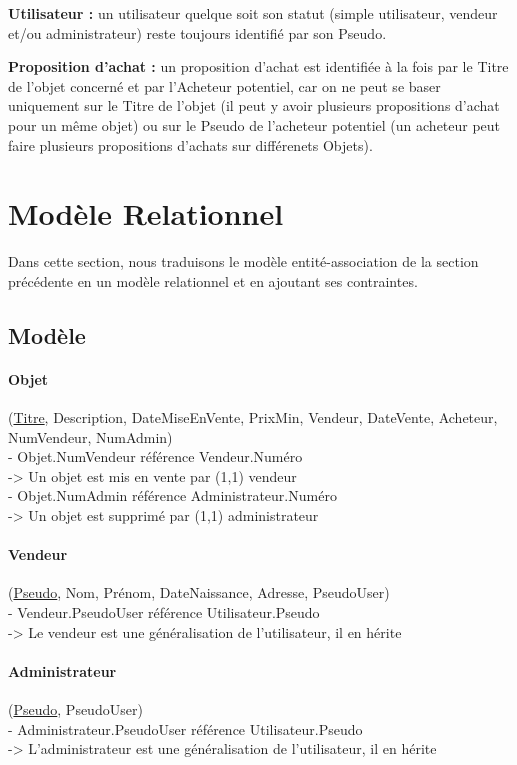 \documentclass[a4paper,11pt]{article}
\begin{document}
\textbf{Utilisateur :} un utilisateur quelque soit son statut (simple utilisateur, vendeur et/ou administrateur) reste toujours identifié
par son Pseudo.

\textbf{Proposition d'achat :} un proposition d'achat est identifiée à la fois par le Titre de l'objet concerné et par l'Acheteur potentiel,
car on ne peut se baser uniquement sur le Titre de l'objet (il peut y avoir plusieurs propositions d'achat pour un même objet)
ou sur le Pseudo de l'acheteur potentiel (un acheteur peut faire plusieurs propositions d'achats sur différenets Objets).

\section{Modèle Relationnel}
Dans cette section, nous traduisons le modèle entité-association de la section précédente en un modèle relationnel et en ajoutant ses contraintes.

\subsection{Modèle}

\indent

\paragraph{Objet} (\underline{Titre}, Description, DateMiseEnVente, PrixMin, Vendeur, DateVente, Acheteur, NumVendeur, NumAdmin)\\
\indent - Objet.NumVendeur référence Vendeur.Numéro \\
\indent \indent -> Un objet est mis en vente par (1,1) vendeur\\
\indent - Objet.NumAdmin référence Administrateur.Numéro \\
\indent \indent -> Un objet est supprimé par (1,1) administrateur


\paragraph{Vendeur} (\underline{Pseudo}, Nom, Prénom, DateNaissance, Adresse, PseudoUser)\\
\indent - Vendeur.PseudoUser référence Utilisateur.Pseudo \\
\indent \indent -> Le vendeur est une généralisation de l'utilisateur, il en hérite

\paragraph{Administrateur} (\underline{Pseudo}, PseudoUser)\\
\indent - Administrateur.PseudoUser référence Utilisateur.Pseudo \\
\indent \indent -> L'administrateur est une généralisation de l'utilisateur, il en hérite
\end{document}
